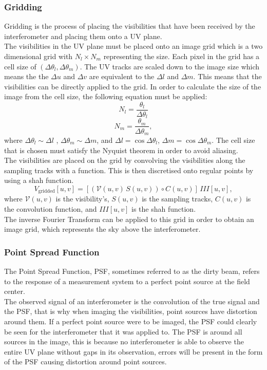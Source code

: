 \subsubsection{Gridding}
Gridding is the process of placing the visibilities that have been received by the interferometer and placing them onto a UV plane.\\
The visibilities in the UV plane must be placed onto an image grid which is a two dimensional grid with $N_l \times N_m$ representing the size. Each pixel in the grid has a cell size of $(\Delta \theta_l, \Delta \theta_m)$. The UV tracks are scaled down to the image size which means the the $\Delta u$ and $\Delta v$ are equivalent to the $\Delta l$  and $\Delta m$. This means that the visibilities can be directly applied to the grid. In order to calculate the size of the image from the cell size, the following equation must be applied: 
$$N_l = \frac{\theta_l}{\Delta \theta_l}$$
$$N_m = \frac{\theta_m}{\Delta \theta_m},$$
where $\Delta \theta_l\sim \Delta l$ , $\Delta \theta_m \sim \Delta m$, and $\Delta l = \cos{\Delta \theta_l}$, $\Delta m = \cos{\Delta \theta_m}$. The cell size that is chosen must satisfy the Nyquist theorem in order to avoid aliasing.\\
The visibilities are placed on the grid by convolving the visibilities along the sampling tracks with a function. This is then discretised onto regular points by using a shah function.
$$V_\text{gridded}[u,v]=[(\mathcal{V}(u,v) \, S(u,v))
\circ C(u,v)] \, III[u,v], $$
where $\mathcal{V}(u,v)$ is the visibility's, $ S(u,v)$ is
the sampling tracks, $C(u,v)$ is the convolution function, and $III[u,v]$ is the shah function.\\
The inverse Fourier Transform can be applied to this grid in order to obtain an image grid, which represents the sky above the interferometer.

\subsubsection{Point Spread Function}
The Point Spread Function, PSF, sometimes referred to as the dirty beam, refers to the response of a
measurement system to a perfect point source at the field center\cite{TEXTBOOK}.
\\
The observed signal of an interferometer is
the convolution of the true signal and the PSF, that is why when imaging the visibilities, point sources
have distortion around them. If a perfect point source were to be imaged, the PSF could clearly be seen for the interferometer that it was applied to. 
The PSF is around all sources in the image, this is because no interferometer is able to observe the entire UV plane without gaps in its observation, errors will be present in the form of the PSF causing distortion around point sources.
